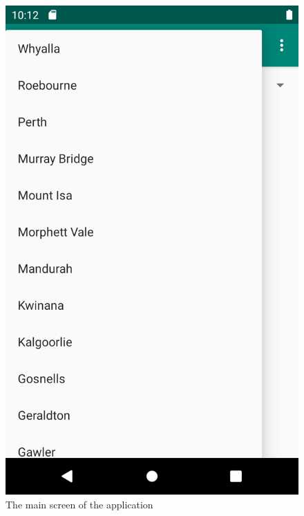 \documentclass{scrartcl}
\begin{document}
\begin{figure}[h]
    \includegraphics[scale=0.2]{images/screen2.png}
    \caption{The main screen of the application}
\end{figure}

\pagebreak
\end{document}
